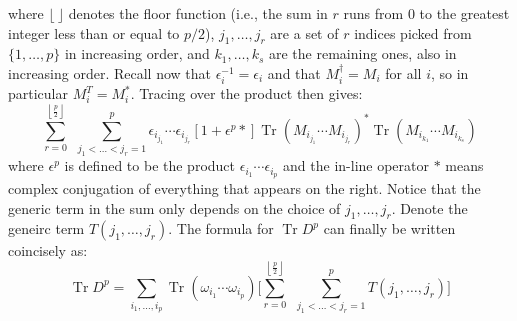 \documentclass[12pt,a4paper]{article}
\DeclareMathOperator{\Tr}{Tr}
\begin{document}
where $\lfloor \ \rfloor$ denotes the floor function (i.e., the sum in $r$ runs from 0 to the greatest integer less than or equal to $p/2$), $j_1, \ldots, j_r$ are a set of $r$ indices picked from $\{ 1, \ldots, p \}$ in increasing order, and $k_1, \ldots, k_s$ are the remaining ones, also in increasing order.\newline
Recall now that $\epsilon_i^{-1} = \epsilon_i$ and that $M_i^\dagger = M_i$ for all $i$, so in particular $M_i^T = M_i^*$. Tracing over the product then gives:
\begin{equation}
\sum_{r=0}^{\left \lfloor \frac{p}{2} \right \rfloor} \ \ \sum_{j_1 < \ldots < j_r = 1}^p \epsilon_{i_{j_1}} \cdots \epsilon_{i_{j_r}} [ 1 + \epsilon^p *] \Tr(M_{i_{j_1}} \cdots M_{i_{j_r}})^* \Tr( M_{i_{k_1}} \cdots M_{i_{k_s}} )
\end{equation}
where $\epsilon^p$ is defined to be the product $\epsilon_{i_1} \cdots \epsilon_{i_p}$ and the in-line operator $*$ means complex conjugation of everything that appears on the right.\newline
Notice that the generic term in the sum only depends on the choice of $j_1, \ldots, j_r$. Denote the geneirc term $T(j_1, \ldots, j_r)$. The formula for $\Tr D^p$ can finally be written coincisely as:
\begin{equation}
\Tr D^p = \sum_{i_1, \ldots, i_p} \Tr (\omega_{i_1} \cdots \omega_{i_p}) \Bigg[  \sum_{r=0}^{\left \lfloor \frac{p}{2} \right \rfloor} \ \ \sum_{j_1 < \ldots < j_r = 1}^p T(j_1, \ldots, j_r) \Bigg]
\end{equation}
\end{document}
